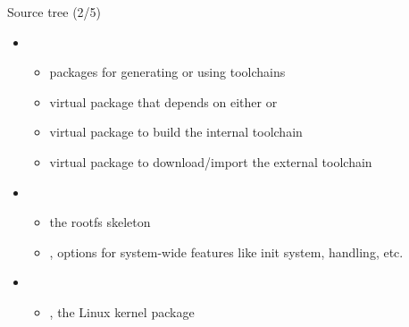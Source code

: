 \begin{frame}{Source tree (2/5)}
  \begin{itemize}
  \item {}
    \begin{itemize}
    \item packages for generating or using toolchains
    \item {} virtual package that depends on either
       or 
    \item {} virtual package to build the
      internal toolchain
    \item {} virtual package to
      download/import the external toolchain
    \end{itemize}
  \item {}
    \begin{itemize}
    \item {} the rootfs skeleton
    \item {}, options for system-wide features like
      init system,  handling, etc.
    \end{itemize}
  \item {}
    \begin{itemize}
    \item {}, the Linux kernel package
    \end{itemize}
  \end{itemize}
\end{frame}

